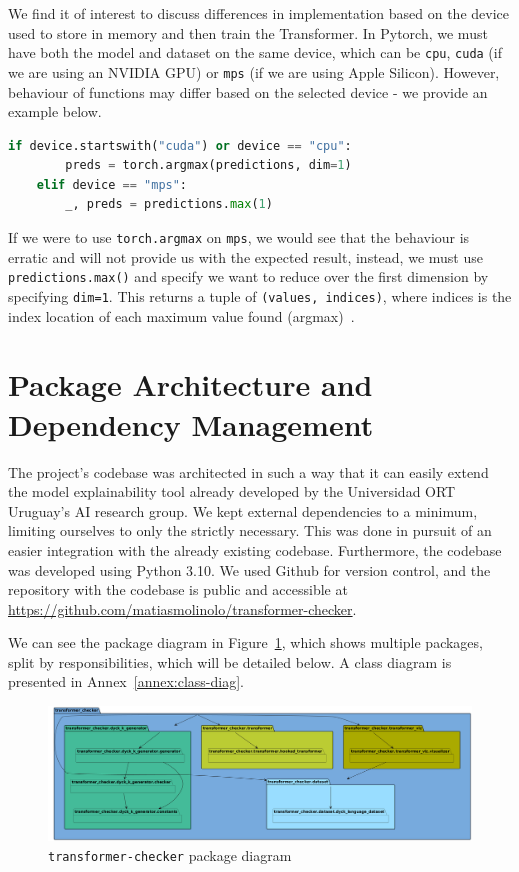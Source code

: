 We find it of interest to discuss differences in implementation based on the device used to store in memory and then train the Transformer. In Pytorch, we must have both the model and dataset on the same device, which can be \verb|cpu|, \verb|cuda| (if we are using an NVIDIA GPU) or \verb|mps| (if we are using Apple Silicon). However, behaviour of functions may differ based on the selected device - we provide an example below.

\begin{lstlisting}[language=Python]
    if device.startswith("cuda") or device == "cpu":
        preds = torch.argmax(predictions, dim=1)
    elif device == "mps":
        _, preds = predictions.max(1)
\end{lstlisting}

If we were to use \verb|torch.argmax| on \verb|mps|, we would see that the behaviour is erratic and will not provide us with the expected result, instead, we must use \verb|predictions.max()| and specify we want to reduce over the first dimension by specifying \verb|dim=1|. This returns a tuple of \verb|(values, indices)|, where indices is the index location of each maximum value found (argmax)~\cite{pytorch-max}.

\section{Package Architecture and Dependency Management}

The project's codebase was architected in such a way that it can easily extend the model explainability tool already developed by the Universidad ORT Uruguay's AI research group. We kept external dependencies to a minimum, limiting ourselves to only the strictly necessary. This was done in pursuit of an easier integration with the already existing codebase. Furthermore, the codebase was developed using Python 3.10. We used Github for version control, and the repository with the codebase is public and accessible at \url{https://github.com/matiasmolinolo/transformer-checker}.

We can see the package diagram in Figure~\ref{fig:package-diag}, which shows multiple packages, split by responsibilities, which will be detailed below. A class diagram is presented in Annex~\ref{annex:class-diag}.

\begin{figure}[h]
    \centering
    \includegraphics[width=\linewidth]{docs/figs/package-diagram.png}
    \caption{\texttt{transformer-checker} package diagram}
    \label{fig:package-diag}
\end{figure}

